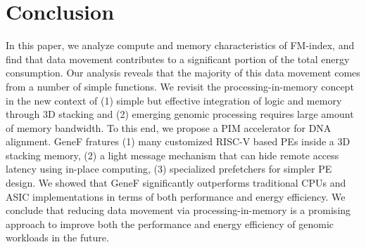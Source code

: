 \documentclass[9pt,conference]{IEEEtran}
\begin{document}
\section{Conclusion}
In this paper, we analyze compute and memory characteristics of FM-index, and find that data movement contributes to a significant portion of the total energy consumption. Our analysis reveals that the majority of this data movement comes from a number of simple functions. We revisit the processing-in-memory concept in the new context of (1) simple but effective integration of logic and memory through 3D stacking and (2) emerging genomic processing requires large amount of memory bandwidth. To this end, we propose a PIM accelerator for DNA alignment. GeneF fratures (1) many customized RISC-V based PEs inside a 3D stacking memory, (2) a light message mechanism that can hide remote access latency using in-place computing, (3) specialized prefetchers for simpler PE design. We showed that GeneF significantly outperforms traditional CPUs and ASIC implementations in terms of both performance and energy efficiency. We conclude that reducing data movement via processing-in-memory is a promising approach to improve both the performance and energy efficiency of genomic workloads in the future.



\end{document}
